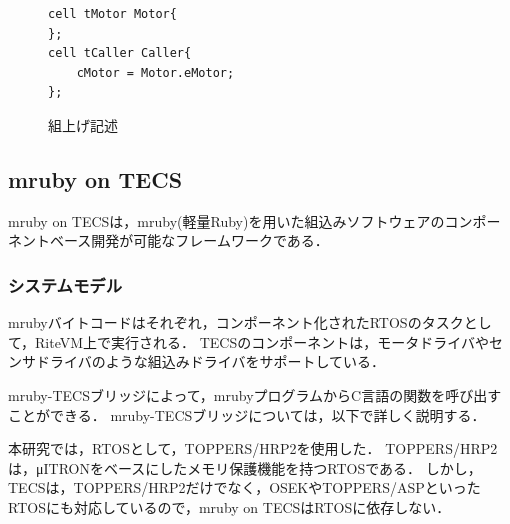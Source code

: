 \documentclass[submit,techrep]{ipsj}
\begin{document}
\begin{figure}[t]
\centering
\begin{lstlisting}
cell tMotor Motor{
};
cell tCaller Caller{
    cMotor = Motor.eMotor;
};
\end{lstlisting}
\caption{組上げ記述}
\label{build}
\end{figure}


\subsection{mruby on TECS}
\label{sec:mruby on TECS}
mruby on TECSは，mruby(軽量Ruby)を用いた組込みソフトウェアのコンポーネントベース開発が可能なフレームワークである．

\subsubsection{システムモデル}
mrubyバイトコードはそれぞれ，コンポーネント化されたRTOSのタスクとして，RiteVM上で実行される．
TECSのコンポーネントは，モータドライバやセンサドライバのような組込みドライバをサポートしている．

mruby-TECSブリッジによって，mrubyプログラムからC言語の関数を呼び出すことができる．
mruby-TECSブリッジについては，以下で詳しく説明する．

本研究では，RTOSとして，TOPPERS/HRP2\cite{par:hr-tecs}を使用した．
TOPPERS/HRP2は，μITRON\cite{par:microITRON}をベースにしたメモリ保護機能を持つRTOSである．
しかし，TECSは，TOPPERS/HRP2だけでなく，OSEK\cite{par:OSEK}やTOPPERS/ASP\cite{url:ASP}といったRTOSにも対応しているので，mruby on TECSはRTOSに依存しない．

\end{document}
